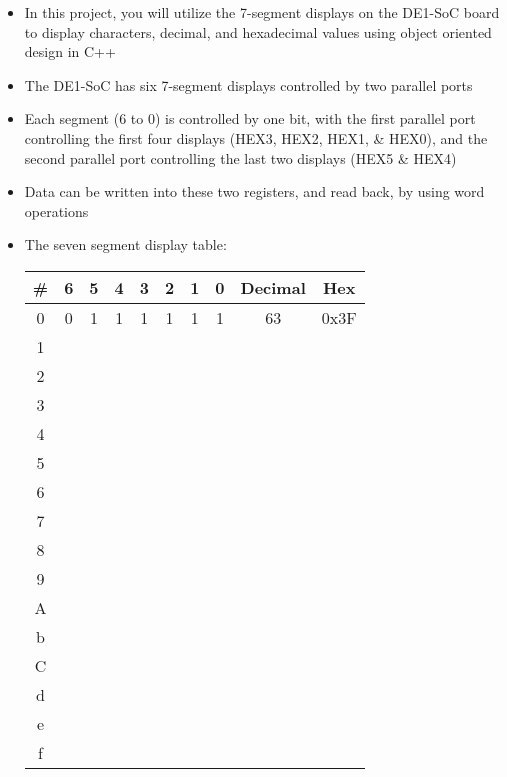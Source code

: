 \begin{itemize}

  \item In this project, you will utilize the 7-segment displays on the DE1-SoC board to display characters, decimal, and hexadecimal values using object oriented design in C++

  \item The DE1-SoC has six 7-segment displays controlled by two parallel ports

  \item Each segment (6 to 0) is controlled by one bit, with the first parallel port controlling the first four displays (HEX3, HEX2, HEX1, \& HEX0), and the second parallel port controlling the last two displays (HEX5 \& HEX4)

  \item Data can be written into these two registers, and read back, by using word operations

  \item The seven segment display table:

    \begin{center}
      \begin{tabular}[h!]{| c | c | c | c | c | c | c | c | c | c |}
        \hline
        \# & 6 & 5 & 4 & 3 & 2 & 1 & 0 & Decimal & Hex \\
        \hline
        0 & 0 & 1 & 1 & 1 & 1 & 1 & 1 & 63 & 0x3F\\
        \hline
        1 & & & & & & & & & \\
        \hline
        2 & & & & & & & & & \\
        \hline
        3 & & & & & & & & & \\
        \hline
        4 & & & & & & & & & \\
        \hline
        5 & & & & & & & & & \\
        \hline
        6 & & & & & & & & & \\
        \hline
        7 & & & & & & & & & \\
        \hline
        8 & & & & & & & & & \\
        \hline
        9 & & & & & & & & & \\
        \hline
        A & & & & & & & & & \\
        \hline
        b & & & & & & & & & \\
        \hline
        C & & & & & & & & & \\
        \hline
        d & & & & & & & & & \\
        \hline
        e & & & & & & & & & \\
        \hline
        f & & & & & & & & & \\
        \hline
      \end{tabular}
    \end{center}


\end{itemize}
